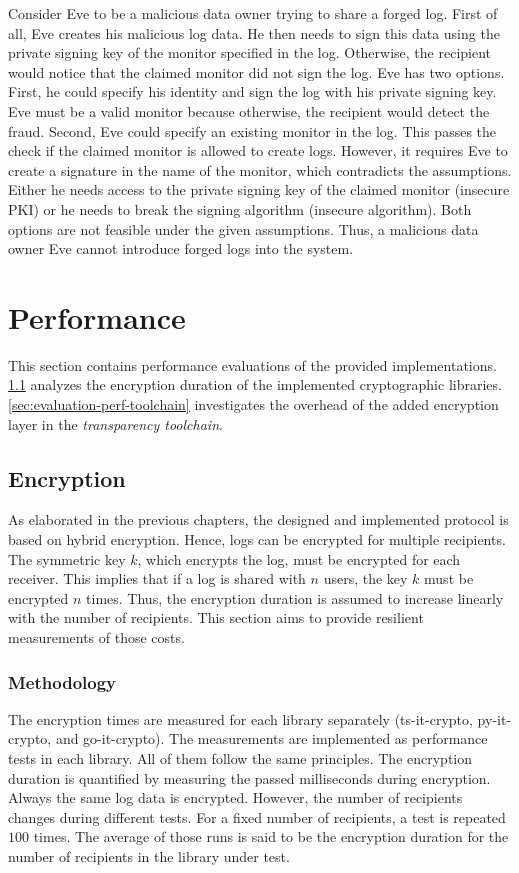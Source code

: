 \documentclass[../main.tex]{subfiles}
\begin{document}
Consider Eve to be a malicious data owner trying to share a forged log.
First of all, Eve creates his malicious log data.
He then needs to sign this data using the private signing key of the monitor specified in the log.
Otherwise, the recipient would notice that the claimed monitor did not sign the log.
Eve has two options.
First, he could specify his identity and sign the log with his private signing key.
Eve must be a valid monitor because otherwise, the recipient would detect the fraud.
Second, Eve could specify an existing monitor in the log.
This passes the check if the claimed monitor is allowed to create logs.
However, it requires Eve to create a signature in the name of the monitor, which contradicts the assumptions.
Either he needs access to the private signing key of the claimed monitor (insecure PKI) or he needs to break the signing algorithm (insecure algorithm).
Both options are not feasible under the given assumptions.
Thus, a malicious data owner Eve cannot introduce forged logs into the system.

\section{Performance}
\label{sec:evaluation-perf}
This section contains performance evaluations of the provided implementations.
\cref{sec:evaluation-perf-enc} analyzes the encryption duration of the implemented cryptographic libraries.
\cref{sec:evaluation-perf-toolchain} investigates the overhead of the added encryption layer in the \emph{transparency toolchain}.

\subsection{Encryption}
\label{sec:evaluation-perf-enc}
As elaborated in the previous chapters, the designed and implemented protocol is based on hybrid encryption.
Hence, logs can be encrypted for multiple recipients.
The symmetric key $k$, which encrypts the log, must be encrypted for each receiver.
This implies that if a log is shared with $n$ users, the key $k$ must be encrypted $n$ times.
Thus, the encryption duration is assumed to increase linearly with the number of recipients.
This section aims to provide resilient measurements of those costs.

\subsubsection{Methodology}
The encryption times are measured for each library separately (ts-it-crypto, py-it-crypto, and go-it-crypto).
The measurements are implemented as performance tests in each library.
All of them follow the same principles.
The encryption duration is quantified by measuring the passed milliseconds during encryption.
Always the same log data is encrypted.
However, the number of recipients changes during different tests.
For a fixed number of recipients, a test is repeated $100$ times.
The average of those runs is said to be the encryption duration for the number of recipients in the library under test.
\end{document}
